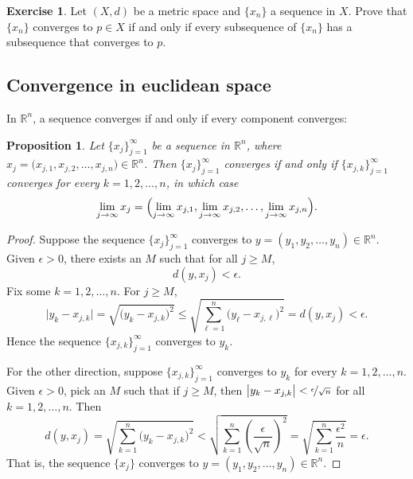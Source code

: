 \documentclass[12pt,openany]{book}
\newcommand{\R}{{\mathbb{R}}}
\theoremstyle{plain}
\newtheorem{prop}[thm]{Proposition}
\theoremstyle{remark}
\theoremstyle{definition}
\newenvironment{exbox}{%
    \def\FrameCommand{\vrule width 1pt \relax\hspace{10pt}}%
    \MakeFramed{\advance\hsize-\width\FrameRestore}%
}{%
    \endMakeFramed
}
\theoremstyle{exercise}
\newtheorem{exercise}{Exercise}[section]
\theoremstyle{example}
\begin{document}
\begin{exbox}
\begin{exercise}
Let $(X,d)$ be a metric space and $\{ x_n \}$ a sequence in $X$.
Prove that $\{ x_n \}$ converges to $p \in X$
if and only if
every subsequence of $\{ x_n \}$ has a subsequence that
converges to $p$.
\end{exercise}
\end{exbox}

\subsection{Convergence in euclidean space}

In $\R^n$, a sequence converges if and only if every
component converges:

\begin{prop} \label{prop:msconveuc}
Let $\{ x_j \}_{j=1}^\infty$ be a sequence in $\R^n$,
where $x_j = \bigl(x_{j,1},x_{j,2},\ldots,x_{j,n}\bigr) \in \R^n$.
Then $\{ x_j \}_{j=1}^\infty$ converges if and only if
$\{ x_{j,k} \}_{j=1}^\infty$ converges for every $k=1,2,\ldots,n$, in which case
\begin{equation*}
\lim_{j\to\infty}
x_j =
\Bigl(
\lim_{j\to\infty} x_{j,1},
\lim_{j\to\infty} x_{j,2},
\ldots,
\lim_{j\to\infty} x_{j,n}
\Bigr) .
\end{equation*}
\end{prop}

\begin{proof}
Suppose
the sequence
$\{ x_j \}_{j=1}^\infty$ converges to
$y = (y_1,y_2,\ldots,y_n) \in \R^n$.
Given $\epsilon > 0$, there exists an $M$ such that for all
$j \geq M$,
\begin{equation*}
d(y,x_j) < \epsilon.
\end{equation*}
Fix some $k=1,2,\ldots,n$.  For $j \geq M$,
\begin{equation*}
\bigl\lvert y_k - x_{j,k} \bigr\rvert
=
\sqrt{{\bigl(y_k - x_{j,k} \bigr)}^2}
\leq
\sqrt{\sum_{\ell=1}^n {\bigl(y_\ell-x_{j,\ell}\bigr)}^2}
= d(y,x_j) < \epsilon .
\end{equation*}
Hence the sequence $\{ x_{j,k} \}_{j=1}^\infty$ converges to $y_k$.

For the other direction, suppose 
$\{ x_{j,k} \}_{j=1}^\infty$ converges to $y_k$ for every $k=1,2,\ldots,n$.
Given $\epsilon > 0$, pick an $M$ such that if $j \geq M$, then 
$\bigl\lvert y_k-x_{j,k} \bigr\rvert < \nicefrac{\epsilon}{\sqrt{n}}$ for all
$k=1,2,\ldots,n$.  Then
\begin{equation*}
d(y,x_j)
=
\sqrt{\sum_{k=1}^n {\bigl(y_k-x_{j,k}\bigr)}^2}
<
\sqrt{\sum_{k=1}^n {\left(\frac{\epsilon}{\sqrt{n}}\right)}^2}
=
\sqrt{\sum_{k=1}^n \frac{{\epsilon^2}}{n}}
= \epsilon .
\end{equation*}
That is, the sequence $\{ x_j \}$ converges to
$y = (y_1,y_2,\ldots,y_n) \in \R^n$.
\end{proof}
\end{document}

